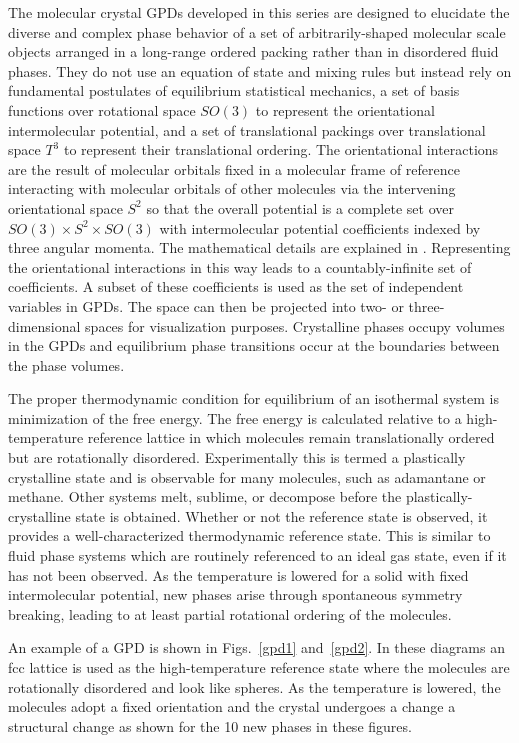 \documentclass[preprint]{iucr}              %
\begin{document}
The molecular crystal GPDs developed in this series are designed to elucidate
the diverse and complex phase behavior of a set of arbitrarily-shaped molecular
scale objects arranged in a long-range ordered packing rather than in
disordered fluid phases.  They do not use an equation of state and mixing rules
but instead rely on fundamental postulates of equilibrium statistical
mechanics, a set of basis functions over rotational space $SO(3)$ to represent
the orientational intermolecular potential, and a set of translational packings
over translational space $T^3$ to represent their translational ordering.  The
orientational interactions are the result of molecular orbitals fixed in a
molecular frame of reference interacting with molecular orbitals of other
molecules via the intervening orientational space $S^2$ so that the overall
potential is a complete set over $SO(3) \times S^2 \times SO(3)$ with
intermolecular potential coefficients indexed by three angular momenta.  The
mathematical details are explained in \cite{Mettes04}.  Representing the
orientational interactions in this way leads to a countably-infinite set of
coefficients.  A subset of these coefficients is used as the set of independent
variables in GPDs.  The space can then be projected into two- or
three-dimensional spaces for visualization purposes.  Crystalline phases occupy
volumes in the GPDs and equilibrium phase transitions occur at the boundaries
between the phase volumes.  

The proper thermodynamic condition for equilibrium of an isothermal system is
minimization of the free energy.  The free energy is calculated relative to a
high-temperature reference lattice in which molecules remain translationally ordered but are
rotationally disordered. Experimentally this is termed a plastically
crystalline state \cite{Sherwood79} and is observable for many molecules,
such as adamantane or methane.  Other systems melt, sublime, or decompose
before the plastically-crystalline state is obtained.  Whether or not the reference state is observed, it provides a well-characterized thermodynamic reference state. This is similar to fluid phase systems which are routinely referenced to an
ideal gas state, even if it has not been observed.  As the temperature is
lowered for a solid with fixed intermolecular potential, new phases arise
through spontaneous symmetry breaking, leading to at least partial rotational
ordering of the molecules.  

An example of a GPD is shown in Figs.~\ref{gpd1} and~\ref{gpd2}.  In these
diagrams an fcc lattice is used as the high-temperature reference state where
the molecules are rotationally disordered and look like spheres.  As the temperature is lowered, the molecules adopt a fixed
orientation and the crystal undergoes a change a structural change as shown for
the 10 new phases in these figures.  
\end{document}
